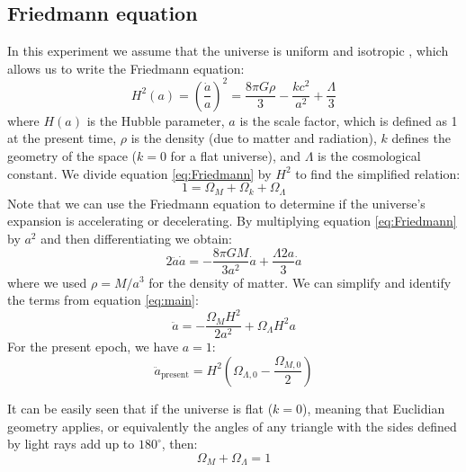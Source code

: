 \documentclass[11pt]{article}
\begin{document}
\subsection{Friedmann equation}
In this experiment we assume that the universe is uniform and isotropic \cite{AS37_lab_script}, which allows us to write the Friedmann equation: 
\begin{equation}
	H^2(a) = \left( \frac{\dot{a}}{a} \right)^2 = \frac{8 \pi G \rho}{3} - \frac{k c^2}{a^2} + \frac{\Lambda}{3}
	\label{eq:Friedmann}
\end{equation}
where $H(a)$ is the Hubble parameter, $a$ is the scale factor, which is defined as 1 at the present time, $\rho$ is the density (due to matter and radiation), $k$ defines the geometry of the space ($k=0$ for a flat universe), and $\Lambda$ is the cosmological constant. We divide equation \eqref{eq:Friedmann} by $H^2$ to find the simplified relation: 
\begin{equation}
	1 = \Omega_M +\Omega_k + \Omega_\Lambda
	\label{eq:main}
\end{equation}
Note that we can use the Friedmann equation to determine if the universe's expansion is accelerating or decelerating. By multiplying equation \eqref{eq:Friedmann} by $a^2$ and then differentiating we obtain: 
\begin{equation}
	2 \ddot{a} \dot{a} = -\frac{8 \pi G M}{3 a^2} \dot{a} + \frac{\Lambda 2 a}{3}  \dot{a}
\end{equation}
where we used $\rho = M/a^3$ for the density of matter. We can simplify and identify the terms from equation \eqref{eq:main}:
\begin{equation}
	\ddot{a} = -\frac{\Omega_M H^2}{2 a^2} + \Omega_{\Lambda} H^2 a
\end{equation}
For the present epoch, we have $a = 1$: 
\begin{equation}
	\ddot{a}_{\mathrm{present}} = H^2 \left(\Omega_{\Lambda,0} - \frac{\Omega_{M,0}}{2}\right)
	\label{eq:exp}
\end{equation}

It can be easily seen that if the universe is flat ($k = 0$), meaning that Euclidian geometry applies, or equivalently the angles of any triangle with the sides defined by light rays add up to $180^\circ$, then: 
\begin{equation}
	\Omega_M + \Omega_\Lambda = 1
	\label{eq:flat}
\end{equation}
\end{document}
